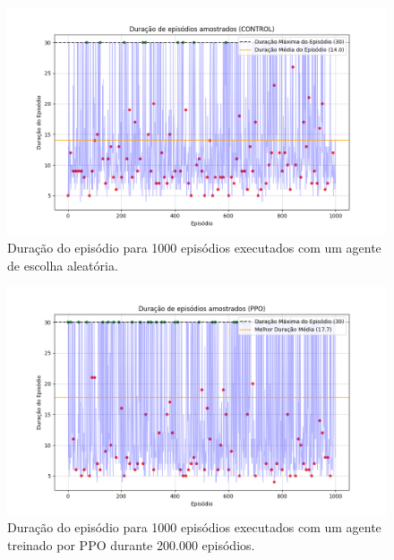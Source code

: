 \documentclass[conference]{IEEEtran}
\begin{document}
\begin{figure}[htpb]
    \centering
    \includegraphics[width=1\linewidth]{figures/episode_lengths_control.png}
    \caption{Duração do episódio para 1000 episódios executados com um agente de escolha aleatória.}
    \label{fig:ep_lens_control}
\end{figure}

\begin{figure}[htpb]
    \centering
    \includegraphics[width=1\linewidth]{figures/episode_lengths_ppo.png}
    \caption{Duração do episódio para 1000 episódios executados com um agente treinado por PPO durante 200.000 episódios.}
    \label{fig:ep_lens_control}
\end{figure}
\end{document}

